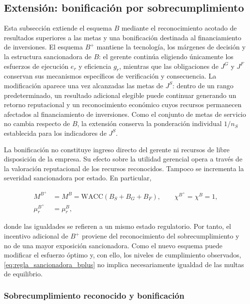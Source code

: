 \subsection{Extensión: bonificación por sobrecumplimiento}

Esta subsección extiende el esquema \(B\) mediante el reconocimiento acotado de resultados superiores a las metas y una bonificación destinada al financiamiento de inversiones. El esquema \(B^{+}\) mantiene la tecnología, los márgenes de decisión y la estructura sancionadora de \(B\): el gerente continúa eligiendo únicamente los esfuerzos de ejecución \(e_r\) y eficiencia \(g_r\), mientras que las obligaciones de \(J^{G}\) y \(J^{F}\) conservan sus mecanismos específicos de verificación y consecuencia. La modificación aparece una vez alcanzadas las metas de \(J^{S}\): dentro de un rango predeterminado, un resultado adicional elegible puede continuar generando un retorno reputacional y un reconocimiento económico cuyos recursos permanecen afectados al financiamiento de inversiones. Como el conjunto de metas de servicio no cambia respecto de \(B\), la extensión conserva la ponderación individual \(1/n_S\) establecida para los indicadores de \(J^{S}\).

La bonificación no constituye ingreso directo del gerente ni recursos de libre disposición de la empresa. Su efecto sobre la utilidad gerencial opera a través de la valoración reputacional de los recursos reconocidos. Tampoco se incrementa la severidad sancionadora por estado. En particular,

\begin{subequations}
\label{eq:regla_sancionadora_bplus}
\begin{align}
M^{B^{+}}
&=
M^{B}
=
\mathrm{WACC}
\left(
B_S+B_G+B_F
\right),
\qquad
\chi^{B^{+}}=\chi^{B}=1,
\label{eq:multa_bplus}
\\
\mu_r^{B^{+}}
&=
\mu_r^{B},
\label{eq:exposicion_bplus}
\end{align}
\end{subequations}

donde las igualdades se refieren a un mismo estado regulatorio. Por tanto, el incentivo adicional de \(B^{+}\) proviene del reconocimiento del sobrecumplimiento y no de una mayor exposición sancionadora. Como el nuevo esquema puede modificar el esfuerzo óptimo y, con ello, los niveles de cumplimiento observados, \eqref{eq:regla_sancionadora_bplus} no implica necesariamente igualdad de las multas de equilibrio.

\subsubsection{Sobrecumplimiento reconocido y bonificación}

